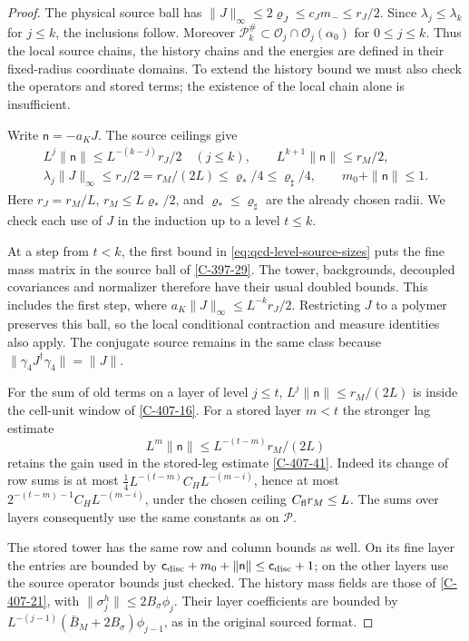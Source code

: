\documentclass[11pt,letterpaper,reqno]{amsart}
\theoremstyle{definition}
\theoremstyle{remark}
\begin{document}
\begin{proof}
The physical source ball has
$\|J\|_\infty\le2\varrho_J\le c_Jm_-\le r_J/2$.
Since $\lambda_j\le\lambda_k$ for $j\le k$, the inclusions
follow. Moreover $\mathcal P_k^\#\subset
\mathscr O_j\cap\mathscr O_j(\alpha_0)$ for $0\le j\le k$.
Thus the local source chains, the history chains and the energies
are defined in their fixed-radius coordinate domains. To extend
the history bound we must also check the operators and stored
terms; the existence of the local chain alone is insufficient.

Write $\mathsf n=-a_KJ$. The source ceilings give
\begin{equation}\label{eq:qcd-level-source-sizes}
\begin{gathered}
 L^j\|\mathsf n\|\le L^{-(k-j)}r_J/2\quad(j\le k),
 \qquad L^{k+1}\|\mathsf n\|\le r_M/2,\\
 \lambda_j\|J\|_\infty\le r_J/2
       =r_M/(2L)\le\varrho_*/4\le\varrho_\sharp/4,
 \qquad m_0+\|\mathsf n\|\le1.
\end{gathered}
\end{equation}
Here $r_J=r_M/L$, $r_M\le L\varrho_*/2$, and
$\varrho_*\le\varrho_\sharp$ are the already chosen radii.
We check each use of $J$ in the induction up to a level $t\le k$.

At a step from $t<k$, the first bound in
\eqref{eq:qcd-level-source-sizes} puts the fine mass matrix
in the source ball of \cref{C-397-29}. The tower, backgrounds,
decoupled covariances and normalizer therefore have their
usual doubled bounds. This includes the first step, where
$a_K\|J\|_\infty\le L^{-k}r_J/2$. Restricting $J$ to a
polymer preserves this ball, so the local conditional
contraction and measure identities also apply. The conjugate
source remains in the same class because
$\|\gamma_4J^\dagger\gamma_4\|=\|J\|$.

For the sum of old terms on a layer of level $j\le t$,
$L^j\|\mathsf n\|\le r_M/(2L)$ is inside the cell-unit
window of \cref{C-407-16}. For a stored layer $m<t$ the
stronger lag estimate
\[
 L^m\|\mathsf n\|\le L^{-(t-m)}r_M/(2L)
\]
retains the gain used in the stored-leg estimate
\cref{C-407-41}. Indeed its change of row sums is at most
$\tfrac14L^{-(t-m)}C_HL^{-(m-i)}$, hence at most
$2^{-(t-m)-1}C_HL^{-(m-i)}$, under the chosen ceiling
$C_{\rm fl}r_M\le L$. The sums over layers consequently use
the same constants as on $\mathcal P$.

The stored tower has the same row and column bounds as well.
On its fine layer the entries are bounded by
$\mathsf c_{\rm disc}+m_0+\|\mathsf n\|
\le\mathsf c_{\rm disc}+1$; on the other layers use the
source operator bounds just checked. The history mass fields
are those of \cref{C-407-21}, with
$\|\sigma_j^h\|\le2B_\sigma\phi_j$. Their layer coefficients
are bounded by
$L^{-(j-1)}(\bar B_M+2B_\sigma)\phi_{j-1}$, as in
the original sourced format.


\end{proof}
\end{document}
